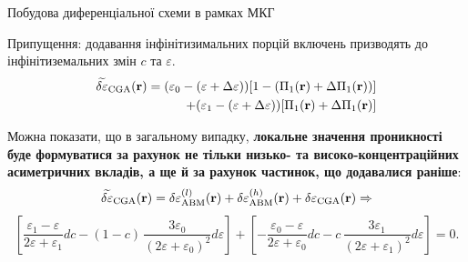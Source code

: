 \documentclass[10pt]{beamer}
\begin{document}
\begin{frame}{Побудова диференціальної схеми в рамках МКГ}
\footnotesize

Припущення: додавання інфінітизимальних порцій включень призводять до інфінітиземальних змін $c$ та $\varepsilon$.
\begin{equation}\label{eq:delta-Brug-diff0}
\begin{split}
  \widetilde{\delta\varepsilon}_{\rm CGA} ({\bf r}) = (\varepsilon_0 - (\varepsilon + \Delta\varepsilon)) [1 - ({\Pi}_1 ({\bf r}) + \Delta{\Pi}_1 ({\bf r}))]\\
  + (\varepsilon_1 - (\varepsilon +   \Delta\varepsilon)) [{\Pi}_1 ({\bf r}) + \Delta{\Pi}_1 ({\bf r})]
\end{split}
\end{equation}

Можна показати, що в загальному випадку, \textbf{локальне значення проникності буде формуватися за рахунок не тільки низько- та високо-концентраційних асиметричних вкладів, а ще й за рахунок частинок, що додавалися раніше}:
\begin{equation}
  \widetilde{\delta\varepsilon}_{\rm CGA} ({\bf r}) = \delta\varepsilon_{\rm ABM}^{(l)} ({\bf r}) + \delta\varepsilon_{\rm ABM}^{(h)} ({\bf r}) + \delta\varepsilon_{\rm CGA} ({\bf r}) \Rightarrow
\end{equation}
$$
  \left[ \frac{\varepsilon_1 - \varepsilon}{2\varepsilon + \varepsilon_1} d c - (1 - c) \, \frac{3\varepsilon_0}{(2\varepsilon + \varepsilon_0)^2} d\varepsilon \right] 
  + \left[ - \frac{\varepsilon_0 - \varepsilon}{2\varepsilon + \varepsilon_0} d c
  - c \, \frac{3\varepsilon_1}{(2\varepsilon + \varepsilon_1)^2} d\varepsilon \right] = 0.
$$

\end{frame}
\end{document}
